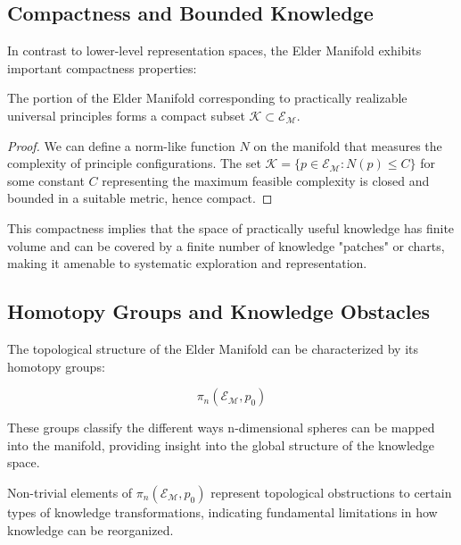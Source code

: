 \subsection{Compactness and Bounded Knowledge}

In contrast to lower-level representation spaces, the Elder Manifold exhibits important compactness properties:

\begin{theorem}
The portion of the Elder Manifold corresponding to practically realizable universal principles forms a compact subset $\mathcal{K} \subset \mathcal{E}_{\mathcal{M}}$.
\end{theorem}

\begin{proof}
We can define a norm-like function $N$ on the manifold that measures the complexity of principle configurations. The set $\mathcal{K} = \{p \in \mathcal{E}_{\mathcal{M}} : N(p) \leq C\}$ for some constant $C$ representing the maximum feasible complexity is closed and bounded in a suitable metric, hence compact.
\end{proof}

This compactness implies that the space of practically useful knowledge has finite volume and can be covered by a finite number of knowledge "patches" or charts, making it amenable to systematic exploration and representation.

\subsection{Homotopy Groups and Knowledge Obstacles}

The topological structure of the Elder Manifold can be characterized by its homotopy groups:

\begin{equation}
\pi_n(\mathcal{E}_{\mathcal{M}}, p_0)
\end{equation}

These groups classify the different ways n-dimensional spheres can be mapped into the manifold, providing insight into the global structure of the knowledge space.

\begin{proposition}
Non-trivial elements of $\pi_n(\mathcal{E}_{\mathcal{M}}, p_0)$ represent topological obstructions to certain types of knowledge transformations, indicating fundamental limitations in how knowledge can be reorganized.
\end{proposition}

